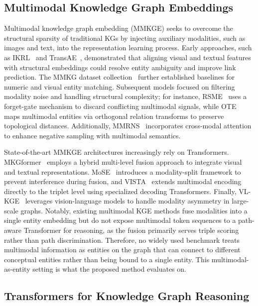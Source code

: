 \documentclass[runningheads]{llncs}
\begin{document}
\subsection{Multimodal Knowledge Graph Embeddings}
\label{sec:rw-mmkge}

Multimodal knowledge graph embedding (MMKGE) seeks to overcome the structural sparsity of traditional KGs by injecting auxiliary modalities, such as images and text, into the representation learning process. Early approaches, such as IKRL~\cite{xie2017image} and TransAE~\cite{wang2019transae}, demonstrated that aligning visual and textual features with structural embeddings could resolve entity ambiguity and improve link prediction. The MMKG dataset collection~\cite{liu2019mmkg} further established baselines for numeric and visual entity matching. Subsequent models focused on filtering modality noise and handling structural complexity; for instance, RSME~\cite{wang2021rsme} uses a forget-gate mechanism to discard conflicting multimodal signals, while OTE~\cite{tang2020orthogonal} maps multimodal entities via orthogonal relation transforms to preserve topological distances. Additionally, MMRNS~\cite{xu2022multimodal} incorporates cross-modal attention to enhance negative sampling with multimodal semantics.

State-of-the-art MMKGE architectures increasingly rely on Transformers. MKGformer~\cite{chen2022mkgformer} employs a hybrid multi-level fusion approach to integrate visual and textual representations. MoSE~\cite{zhao2022mose} introduces a modality-split framework to prevent interference during fusion, and VISTA~\cite{lee2023vista} extends multimodal encoding directly to the triplet level using specialized decoding Transformers. Finally, VL-KGE~\cite{efthymiou2026vlkge} leverages vision-language models to handle modality asymmetry in large-scale graphs. Notably, existing multimodal KGE methods fuse modalities into a single entity embedding but do not expose multimodal token sequences to a path-aware Transformer for reasoning, as the fusion primarily serves triple scoring rather than path discrimination. Therefore, no widely used benchmark treats multimodal information as entities on the graph that can connect to different conceptual entities rather than being bound to a single entity. This multimodal-as-entity setting is what the proposed method evaluates on.

\subsection{Transformers for Knowledge Graph Reasoning}
\label{sec:rw-transformers}
\end{document}
